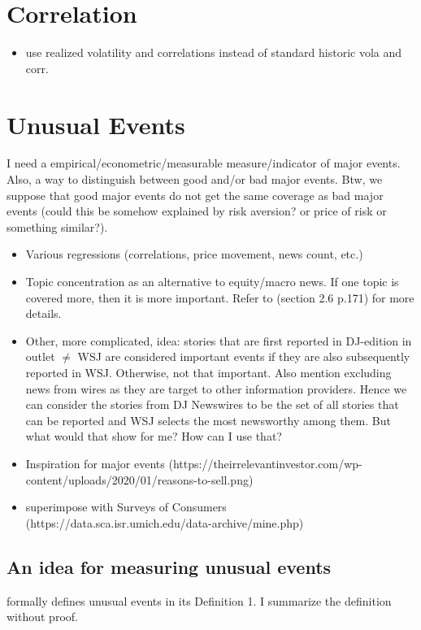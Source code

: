 \section{Correlation}

\begin{itemize}
    \item use realized volatility and correlations instead of standard historic vola and corr.
\end{itemize}

\section{Unusual Events}
I need a empirical/econometric/measurable measure/indicator of major events. Also, a way to distinguish between good and/or bad major events. Btw, we suppose that good major events do not get the same coverage as bad major events (could this be somehow explained by risk aversion? or price of risk or something similar?).

\begin{itemize}
    \item Various regressions (correlations, price movement, news count, etc.)
    \item Topic concentration as an alternative to equity/macro news. If one topic is covered more, then it is more important. Refer to \textcite{Nimark2019} (section 2.6 p.171) for more details.
    \item Other, more complicated, idea: stories that are first reported in DJ-edition in outlet $\neq$ WSJ are considered important events if they are also subsequently reported in WSJ. Otherwise, not that important. Also \textcite{Nimark2019} mention excluding news from wires as they are target to other information providers. Hence we can consider the stories from DJ Newswires to be the set of all stories that can be reported and WSJ selects the most newsworthy among them. But what would that show for me? How can I use that?
    \item Inspiration for major events (https://theirrelevantinvestor.com/wp-content/uploads/2020/01/reasons-to-sell.png)
    \item superimpose with Surveys of Consumers (https://data.sca.isr.umich.edu/data-archive/mine.php)
\end{itemize}

\subsection{An idea for measuring unusual events}
\textcite{Nimark2014} formally defines unusual events in its Definition 1\footnotemark. I summarize the definition without proof.

